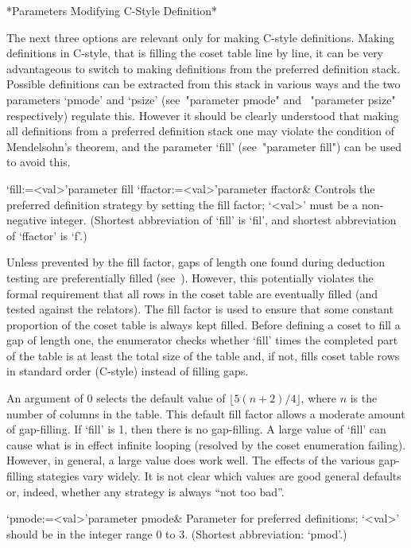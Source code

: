 *Parameters Modifying C-Style Definition*

The  next  three  options  are   relevant  only  for  making   C-style
definitions.  Making definitions in C-style, that is filling the coset
table line  by line, it can  be very advantageous to  switch to making
definitions from the preferred definition stack.  Possible definitions
can  be  extracted  from  this  stack  in various  ways  and  the  two
parameters `pmode'  and `psize' (see~"parameter  pmode" and ~"parameter
psize"  respectively)  regulate this.  However  it  should be  clearly
understood that  making  all definitions  from  a preferred  definition
stack one may  violate the condition of Mendelsohn's  theorem, and the
parameter `fill' (see~"parameter fill") can be used to avoid this.

\>`fill:=<val>'{parameter fill}
\>`ffactor:=<val>'{parameter ffactor}&
Controls the preferred definition strategy by setting the fill factor;
`<val>' must be a non-negative integer.
(Shortest abbreviation of `fill' is `fil', and shortest abbreviation of 
`ffactor' is `f'.)

Unless prevented by  the fill factor, gaps of  length one found during
deduction   testing   are   preferentially  filled   (see~\cite{Hav}).
However,  this potentially  violates the  formal requirement  that all
rows in the coset table  are eventually filled (and tested against the
relators).   The fill  factor is  used  to ensure  that some  constant
proportion of the coset table  is always kept filled.  Before defining
a coset  to fill a  gap of length  one, the enumerator  checks whether
`fill' times  the completed part  of the table  is at least  the total
size of  the table  and, if  not, fills coset  table rows  in standard
order (C-style) instead of filling gaps.

An  argument of  0  selects  the default  value  of $\lfloor  5(n+2)/4
\rfloor$,  where $n$  is the  number of  columns in  the  table.  This
default  fill factor  allows  a moderate  amount  of gap-filling.   If
`fill' is  1, then there is  no gap-filling.  A large  value of `fill'
can cause  what is in effect  infinite looping (resolved  by the coset
enumeration failing).   However, in general,  a large value  does work
well.  The  effects of the various gap-filling  stategies vary widely.
It is  not clear  which values are  good general defaults  or, indeed,
whether any strategy is always ``not too bad''.

\>`pmode:=<val>'{parameter pmode}&
Parameter for preferred definitions;  `<val>' should be in the integer
range 0 to 3. (Shortest abbreviation: `pmod'.)

